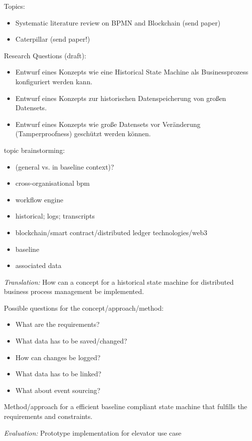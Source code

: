 Topics:
\begin{itemize}
\item Systematic literature review on BPMN and Blockchain (send paper)
\item Caterpillar (send paper!)

\end{itemize}

Research Questions (draft):
\begin{itemize}
\item Entwurf eines Konzepts wie eine Historical State Machine als Businessprozess konfiguriert werden kann.
\item Entwurf eines Konzepts zur historischen Datenspeicherung von großen Datensets.
\item Entwurf eines Konzepts wie große Datensets vor Veränderung (Tamperproofness) geschützt werden können.
\end{itemize}

topic brainstorming:
\begin{itemize}
\item (general vs. in baseline context)?
\item cross-organisational bpm
\item workflow engine
\item historical; logs; transcripts
\item blockchain/smart contract/distributed ledger technologies/web3
\item baseline
\item associated data
\end{itemize}

\emph{Translation:}
How can a concept for a historical state machine for distributed business process management be implemented.

Possible questions for the concept/approach/method:
\begin{itemize}
\item What are the requirements?
\item What data has to be saved/changed?
\item How can changes be logged?
\item What data has to be linked?
\item What about event sourcing?
\end{itemize}

Method/approach for a efficient baseline compliant state machine that
fulfills the requirements and constraints.

\emph{Evaluation:} Prototype implementation for elevator use case

